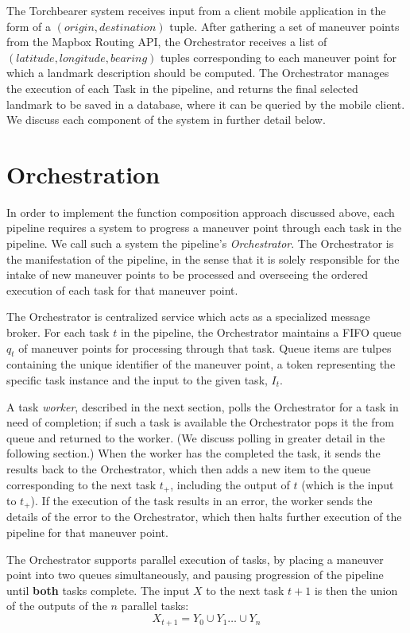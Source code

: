 The Torchbearer system receives input from a client mobile application in the form of a $(origin, destination)$ tuple. After gathering a set of maneuver points from the Mapbox Routing API, the Orchestrator receives a list of $(latitude, longitude, bearing)$ tuples corresponding to each maneuver point for which a landmark description should be computed. The Orchestrator manages the execution of each Task in the pipeline, and returns the final selected landmark to be saved in a database, where it can be queried by the mobile client. We discuss each component of the system in further detail below.

\section{Orchestration}\label{sec:arch:orchestration}
In order to implement the function composition approach discussed above, each pipeline requires a system to progress a maneuver point through each task in the pipeline. We call such a system the pipeline’s \textit{Orchestrator}. The Orchestrator is the manifestation of the pipeline, in the sense that it is solely responsible for the intake of new maneuver points to be processed and overseeing the ordered execution of each task for that maneuver point.

The Orchestrator is centralized service which acts as a specialized message broker. For each task $t$ in the pipeline, the Orchestrator maintains a FIFO queue $q_t$ of maneuver points for processing through that task. Queue items are tulpes containing the unique identifier of the maneuver point, a token representing the specific task instance and the input to the given task, $I_t$.

A task \textit{worker}, described in the next section, polls the Orchestrator for a task in need of completion; if such a task is available the Orchestrator pops it the from queue and returned to the worker. (We discuss polling in greater detail in the following section.) When the worker has the completed the task, it sends the results back to the Orchestrator, which then adds a new item to the queue corresponding to the next task $t_+$, including the output of $t$ (which is the input to $t_+$). If the execution of the task results in an error, the worker sends the details of the error to the Orchestrator, which then halts further execution of the pipeline for that maneuver point.

The Orchestrator supports parallel execution of tasks, by placing a maneuver point into two queues simultaneously, and pausing progression of the pipeline until \textbf{both} tasks complete. The input $X$ to the next task $t+1$ is then the union of the outputs of the $n$ parallel tasks:
\begin{equation}\label{eq:paraOrch}
    X_{t+1} = Y_0 \cup Y_1 \dots \cup Y_n
\end{equation}

